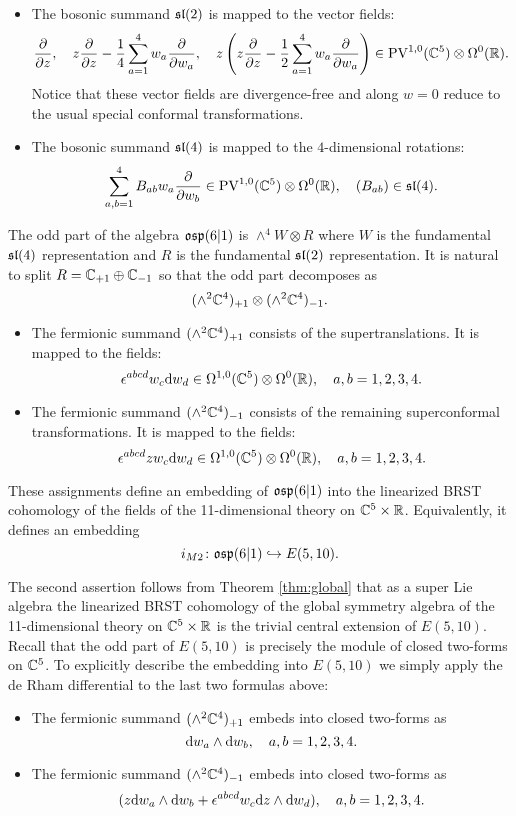 \begin{itemize}
\item The bosonic summand $\mathfrak{sl}(2)$ is mapped to the vector fields:
\[
\frac{\partial}{\partial z} ,\quad z \frac{\partial}{\partial z} - \frac14 \sum_{a=1}^4 w_a \frac{\partial}{\partial w_a} , \quad z \left(z \frac{\partial}{\partial z} - \frac12 \sum_{a=1}^4 w_a \frac{\partial}{\partial w_a} \right) \in {\rm PV}^{1,0}(\mathbb C^5) \otimes \Omega^0(\mathbb R) .
\]
Notice that these vector fields are divergence-free and along $w=0$ reduce to the usual special conformal transformations.
\item The bosonic summand $\mathfrak{sl}(4)$ is mapped to the $4$-dimensional rotations: 
\[
\sum_{a,b=1}^4 B_{ab} w_a \frac{\partial}{\partial w_b} \in {\rm PV}^{1,0}(\mathbb C^5) \otimes \Omega^0(\mathbb R) , \quad (B_{ab}) \in \mathfrak{sl}(4) .
\]
\end{itemize}

The odd part of the algebra $\mathfrak{osp}(6|1)$ is $\wedge^4 W \otimes R$ where $W$ is the fundamental $\mathfrak{sl}(4)$ representation and $R$ is the fundamental $\mathfrak{sl}(2)$ representation. 
It is natural to split $R = \mathbb C_{+1} \oplus \mathbb C_{-1}$ so that the odd part decomposes as
\[
(\wedge^2 \mathbb C^4)_{+1} \otimes (\wedge^2 \mathbb C^4)_{-1} .
\]

\begin{itemize}
\item 
The fermionic summand $(\wedge^2 \mathbb C^4)_{+1}$ consists of the supertranslations. 
It is mapped to the fields: 
\[
\epsilon^{abcd} w_c {\rm d} w_d \in \Omega^{1,0}(\mathbb C^5) \otimes \Omega^0(\mathbb R) , \quad a,b=1,2,3,4. 
\] 
\item The fermionic summand $(\wedge^2 \mathbb C^4)_{-1}$ consists of the remaining superconformal transformations. 
It is mapped to the fields: 
\[
\epsilon^{abcd} z w_c {\rm d} w_d \in \Omega^{1,0}(\mathbb C^5) \otimes \Omega^0(\mathbb R) , \quad a,b=1,2,3,4. 
\] 
\end{itemize}


\begin{lem}
These assignments define an embedding of $\mathfrak{osp}(6|1)$ into the linearized BRST cohomology of the fields of the 11-dimensional theory on $\mathbb C^5 \times \mathbb R$. 
Equivalently, it defines an embedding
\[
i_{M2} \colon \mathfrak{osp}(6|1) \hookrightarrow E(5,10) .
\]
\end{lem} 

The second assertion follows from Theorem \ref{thm:global} that as a super Lie algebra the linearized BRST cohomology of the global symmetry algebra of the 11-dimensional theory on $\mathbb C^5 \times \mathbb R$ is the trivial central extension of $E(5,10)$. 
Recall that the odd part of $E(5,10)$ is precisely the module of closed two-forms on $\mathbb C^5$. 
To explicitly describe the embedding into $E(5,10)$ we simply apply the de Rham differential to the last two formulas above:
\begin{itemize}
\item 
The fermionic summand $(\wedge^2 \mathbb C^4)_{+1}$ embeds into closed two-forms as
\[
{\rm d} w_a \wedge {\rm d} w_b, \quad a,b=1,2,3,4. 
\] 
\item The fermionic summand $(\wedge^2 \mathbb C^4)_{-1}$ embeds into closed two-forms as
\[
(z {\rm d} w_a  \wedge {\rm d} w_b + \epsilon^{abcd} w_c {\rm d} z \wedge {\rm d} w_d) , \quad a,b=1,2,3,4. 
\] 
\end{itemize}

